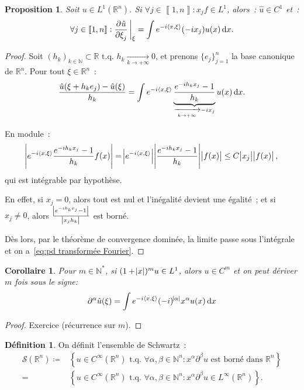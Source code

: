 \documentclass{report}
\newcommand{\R}{{\mathbb R}}
\newcommand{\N}{{\mathbb N}}
\newcommand{\scpr}[2]{\left\langle#1, #2\right\rangle}
\newcommand{\tq}{\text{ t.q. }}
\newcommand{\pinfty}{{+\infty}}
\newcommand{\intint}[2]{{\left\llbracket#1, #2\right\rrbracket}}
\newtheorem{prp}[thm]{Proposition}
\newtheorem{cor}[thm]{Corollaire}
\theoremstyle{definition}
\newtheorem{déf}[thm]{Définition}
\theoremstyle{remark}
\begin{document}
\begin{prp} Soit $u \in L^1(\R^n)$. Si $\forall j \in \intint 1n : x_jf \in L^1$, alors~: $\hat u \in C^1$ et~:
\begin{equation}\label{eq:pd transformée Fourier}
	\forall j \in \intint 1n : \dpd {\hat u}{\xi_j}\sVert[3]_\xi = \int e^{-i\scpr x\xi}(-ix_j)u(x)\dif x.
\end{equation}
\end{prp}

\begin{proof} Soit $(h_k)_{k \in \N} \subset \R \tq h_k \xrightarrow[k \to \pinfty]{} 0$, et prenons $\{e_j\}_{j=1}^n$ la base canonique de $\R^n$. Pour tout $\xi \in \R^n$~:
\[\frac {\hat u(\xi + h_ke_j) - \hat u(\xi)}{h_k} = \int e^{-i\scpr x\xi}\underbrace {\frac {e^{-ih_kx_j}-1}{h_k}}_{\xrightarrow[k \to \pinfty]{} -ix_j}u(x)\dif x.\]

En module~:
\[\abs {e^{-i\scpr x\xi}\frac {e^{-ih_kx_j}-1}{h_k}f(x)} = \abs {e^{-i\scpr x\xi}}\abs {\frac {e^{-ih_kx_j}-1}{h_k}}\abs {f(x)} \leq C\abs {x_j}\abs {f(x)},\]
qui est intégrable par hypothèse.

En effet, si $x_j = 0$, alors tout est nul et l'inégalité devient une égalité~; et si $x_j \neq 0$, alors $\frac {\abs {e^{-ih_kx_j}-1}}{\abs {x_jh_k}}$ est borné.

Dès lors, par le théorème de convergence dominée, la limite passe sous l'intégrale et on a~\eqref{eq:pd transformée Fourier}.
\end{proof}

\begin{cor} Pour $m \in \N^*$, si $(1+\abs x)^mu \in L^1$, alors $u \in C^m$ et on peut dériver $m$ fois sous le signe:
\[\partial^\alpha\hat u(\xi) = \int e^{-i\scpr x\xi}(-i)^{\abs \alpha}x^\alpha u(x)\dif x\]
\end{cor}

\begin{proof} Exercice (récurrence sur $m$).
\end{proof}

\begin{déf} On définit l'ensemble de Schwartz~:
\begin{equation}\begin{aligned}
	\mathcal S(\R^n) \coloneqq &\left\{u \in C^\infty(\R^n) \tq \forall \alpha, \beta \in \N^n : x^\alpha\partial^\beta u \text{ est borné dans } \R^n\right\} \\
		= &\left\{u \in C^\infty(\R^n) \tq \forall \alpha, \beta \in \N^n : x^\alpha\partial^\beta u \in L^\infty(\R^n)\right\}.
\end{aligned}\end{equation}
\end{déf}
\end{document}
